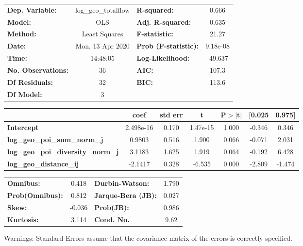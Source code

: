 \begin{center}
\begin{tabular}{lclc}
\toprule
\textbf{Dep. Variable:}                    & log\_geo\_totalflow & \textbf{  R-squared:         } &     0.666   \\
\textbf{Model:}                            &         OLS         & \textbf{  Adj. R-squared:    } &     0.635   \\
\textbf{Method:}                           &    Least Squares    & \textbf{  F-statistic:       } &     21.27   \\
\textbf{Date:}                             &   Mon, 13 Apr 2020  & \textbf{  Prob (F-statistic):} &  9.18e-08   \\
\textbf{Time:}                             &       14:48:05      & \textbf{  Log-Likelihood:    } &   -49.637   \\
\textbf{No. Observations:}                 &            36       & \textbf{  AIC:               } &     107.3   \\
\textbf{Df Residuals:}                     &            32       & \textbf{  BIC:               } &     113.6   \\
\textbf{Df Model:}                         &             3       & \textbf{                     } &             \\
\bottomrule
\end{tabular}
\begin{tabular}{lcccccc}
                                           & \textbf{coef} & \textbf{std err} & \textbf{t} & \textbf{P$> |$t$|$} & \textbf{[0.025} & \textbf{0.975]}  \\
\midrule
\textbf{Intercept}                         &    2.498e-16  &        0.170     &  1.47e-15  &         1.000        &       -0.346    &        0.346     \\
\textbf{log\_geo\_poi\_sum\_norm\_j}       &       0.9803  &        0.516     &     1.900  &         0.066        &       -0.071    &        2.031     \\
\textbf{log\_geo\_poi\_diversity\_norm\_j} &       3.1183  &        1.625     &     1.919  &         0.064        &       -0.192    &        6.428     \\
\textbf{log\_geo\_distance\_ij}            &      -2.1417  &        0.328     &    -6.535  &         0.000        &       -2.809    &       -1.474     \\
\bottomrule
\end{tabular}
\begin{tabular}{lclc}
\textbf{Omnibus:}       &  0.418 & \textbf{  Durbin-Watson:     } &    1.790  \\
\textbf{Prob(Omnibus):} &  0.812 & \textbf{  Jarque-Bera (JB):  } &    0.027  \\
\textbf{Skew:}          & -0.036 & \textbf{  Prob(JB):          } &    0.986  \\
\textbf{Kurtosis:}      &  3.114 & \textbf{  Cond. No.          } &     9.62  \\
\bottomrule
\end{tabular}
\end{center}

Warnings: \newline
 [1] Standard Errors assume that the covariance matrix of the errors is correctly specified.